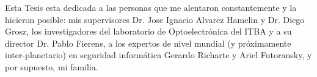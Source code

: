 \documentclass[12pt,twoside,openright]{moddalthesis}
\begin{document}
\begin{acknowledgements}
Esta Tesis esta dedicada a las personas que me alentaron constantemente y la hicieron posible: mis supervisores Dr. Jose Ignacio Alvarez Hamelin y Dr. Diego Grosz, los investigadores del laboratorio de Optoelectrónica del ITBA y a su director Dr. Pablo Fierens, a los expertos de nivel mundial (y próximamente inter-planetario) en seguridad informática Gerardo Richarte y Ariel Futoransky, y por supuesto, mi familia.
\end{acknowledgements}



%

\listoffigures
{}



\afterpreface
\linespread{1.5}









\appendix
\cleardoublepage
%




\linespread{1.44}
%

%


%  
\end{document}
